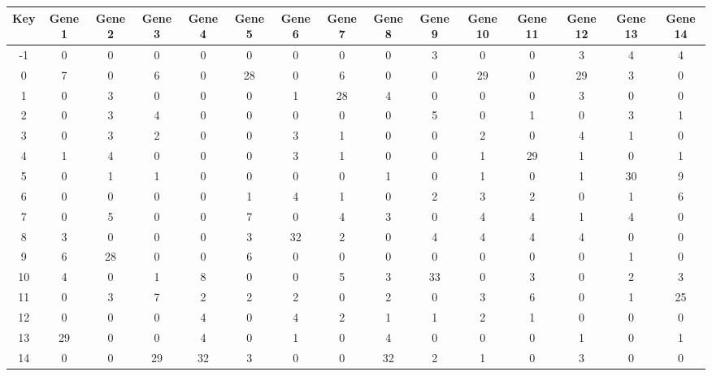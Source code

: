 \begin{tabular}{|c|c|c|c|c|c|c|c|c|c|c|c|c|c|c|}
\hline
Key & Gene 1 & Gene 2 & Gene 3 & Gene 4 & Gene 5 & Gene 6 & Gene 7 & Gene 8 & Gene 9 & Gene 10 & Gene 11 & Gene 12 & Gene 13 & Gene 14 \\
\hline
-1 & 0 & 0 & 0 & 0 & 0 & 0 & 0 & 0 & 3 & 0 & 0 & 3 & 4 & 4 \\
0 & 7 & 0 & 6 & 0 & 28 & 0 & 6 & 0 & 0 & 29 & 0 & 29 & 3 & 0 \\
1 & 0 & 3 & 0 & 0 & 0 & 1 & 28 & 4 & 0 & 0 & 0 & 3 & 0 & 0 \\
2 & 0 & 3 & 4 & 0 & 0 & 0 & 0 & 0 & 5 & 0 & 1 & 0 & 3 & 1 \\
3 & 0 & 3 & 2 & 0 & 0 & 3 & 1 & 0 & 0 & 2 & 0 & 4 & 1 & 0 \\
4 & 1 & 4 & 0 & 0 & 0 & 3 & 1 & 0 & 0 & 1 & 29 & 1 & 0 & 1 \\
5 & 0 & 1 & 1 & 0 & 0 & 0 & 0 & 1 & 0 & 1 & 0 & 1 & 30 & 9 \\
6 & 0 & 0 & 0 & 0 & 1 & 4 & 1 & 0 & 2 & 3 & 2 & 0 & 1 & 6 \\
7 & 0 & 5 & 0 & 0 & 7 & 0 & 4 & 3 & 0 & 4 & 4 & 1 & 4 & 0 \\
8 & 3 & 0 & 0 & 0 & 3 & 32 & 2 & 0 & 4 & 4 & 4 & 4 & 0 & 0 \\
9 & 6 & 28 & 0 & 0 & 6 & 0 & 0 & 0 & 0 & 0 & 0 & 0 & 1 & 0 \\
10 & 4 & 0 & 1 & 8 & 0 & 0 & 5 & 3 & 33 & 0 & 3 & 0 & 2 & 3 \\
11 & 0 & 3 & 7 & 2 & 2 & 2 & 0 & 2 & 0 & 3 & 6 & 0 & 1 & 25 \\
12 & 0 & 0 & 0 & 4 & 0 & 4 & 2 & 1 & 1 & 2 & 1 & 0 & 0 & 0 \\
13 & 29 & 0 & 0 & 4 & 0 & 1 & 0 & 4 & 0 & 0 & 0 & 1 & 0 & 1 \\
14 & 0 & 0 & 29 & 32 & 3 & 0 & 0 & 32 & 2 & 1 & 0 & 3 & 0 & 0 \\
\hline
\end{tabular}